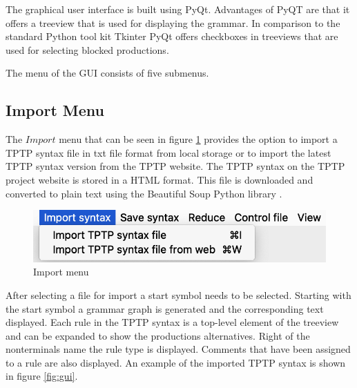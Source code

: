The graphical user interface is built using PyQt. Advantages of PyQT are that it offers a treeview that is used for displaying the grammar. In comparison to the standard Python tool kit Tkinter PyQt offers checkboxes in treeviews \cite{Tkinter} that are used for selecting blocked productions.

The menu of the GUI consists of five submenus.

\subsection{Import Menu}\label{sec:ConceptGUIImportMenu}

The $Import$ menu that can be seen in figure \ref{fig:import} provides the option to import a \ac{TPTP} syntax file in txt file format from local storage or to import the latest \ac{TPTP} syntax version from the \ac{TPTP} website.
The \ac{TPTP} syntax on the \ac{TPTP} project website is stored in a HTML format.
This file is downloaded and converted to plain text using the Beautiful Soup Python library \cite{BeautifulSoup}.

\begin{figure}[H]
\centering
\includegraphics[width=.7\textwidth]{images/import.png}
\caption{Import menu}
\label{fig:import}
\end{figure}

After selecting a file for import a start symbol needs to be selected.
Starting with the start symbol a grammar graph is generated and the corresponding text displayed.
Each rule in the \ac{TPTP} syntax is a top-level element of the treeview and can be expanded to show the productions alternatives.
Right of the nonterminals name the rule type is displayed.
Comments that have been assigned to a rule are also displayed. An example of the imported \ac{TPTP} syntax is shown in figure \ref{fig:gui}.

